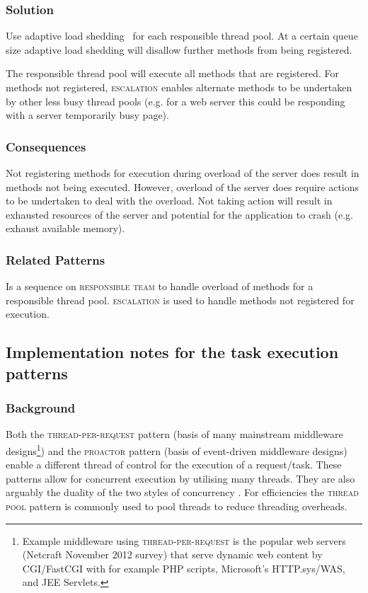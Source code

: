 \documentclass[prodmode]{style/acmlarge}
\begin{document}
\subsubsection*{\textbf{Solution}} Use adaptive load shedding~\cite{seda} for
each responsible thread pool.  At a certain queue size adaptive load shedding
will disallow further methods from being registered.

The responsible thread pool will execute all methods that are registered.  For
methods not registered, \textsc{escalation} enables alternate methods to be
undertaken by other less busy thread pools (e.g. for a web server this could be
responding with a server temporarily busy page).

\subsubsection*{Consequences} Not registering methods for execution during
overload of the server does result in methods not being executed.  However,
overload of the server does require actions to be undertaken to deal with the
overload.  Not taking action will result in exhausted resources of the server
and potential for the application to crash (e.g. exhaust available memory).

\subsubsection*{Related Patterns} Is a sequence on \textsc{responsible team} to
handle overload of methods for a responsible thread pool.  \textsc{escalation}
is used to handle methods not registered for execution.



\subsection{\textbf{Implementation notes for the task execution patterns}}

\subsubsection*{Background}

Both the \textsc{thread-per-request} pattern \cite{thread-per-request} (basis of
many mainstream middleware designs\footnote{Example middleware using
\textsc{thread-per-request} is the popular web servers (Netcraft November 2012
survey) that serve dynamic web content by CGI/FastCGI with for example PHP
scripts, Microsoft's HTTP.sys/WAS, and JEE Servlets.}) and the \textsc{proactor}
pattern \cite{proactor} (basis of event-driven middleware designs) enable a
different thread of control for the execution of a request/task.  These patterns
allow for concurrent execution by utilising many threads.  They are also
arguably the duality of the two styles of concurrency \cite{duality-event-thread}. 
For efficiencies the \textsc{thread pool} pattern \cite{thread-per-request} is
commonly used to pool threads to reduce threading overheads.
\end{document}
